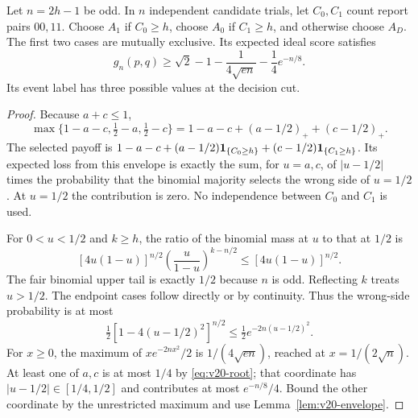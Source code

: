 \begin{lemma}
\label{lem:v20-majority}
Let $n=2h-1$ be odd. In $n$ independent candidate trials, let $C_0,C_1$
count report pairs $00,11$. Choose $A_1$ if $C_0\ge h$, choose $A_0$
if $C_1\ge h$, and otherwise choose $A_D$. The first two cases are
mutually exclusive. Its expected ideal score satisfies
\begin{equation}\label{eq:v20-majorityscore}
 g_n(p,q)\ge\sqrt2-1-\frac1{4\sqrt{en}}
                            -\frac14e^{-n/8}.
\end{equation}
Its event label has three possible values at the decision cut.
\end{lemma}
\begin{proof}
Because $a+c\le1$,
\[
 \max\{1-a-c,\tfrac12-a,\tfrac12-c\}
 =1-a-c+(a-1/2)_++(c-1/2)_+.
\]
The selected payoff is
$1-a-c+(a-1/2)\mathbf 1_{\{C_0\ge h\}}
             +(c-1/2)\mathbf 1_{\{C_1\ge h\}}$.
Its expected loss from this envelope is exactly the sum, for $u=a,c$,
of $|u-1/2|$ times the probability that the binomial majority selects
the wrong side of $u=1/2$. At $u=1/2$ the contribution is zero.
No independence between $C_0$ and $C_1$ is used.

For $0<u<1/2$ and $k\ge h$, the ratio of the binomial mass at $u$ to
that at $1/2$ is
\[
 [4u(1-u)]^{n/2}\left(\frac{u}{1-u}\right)^{k-n/2}
                  \le[4u(1-u)]^{n/2}.
\]
The fair binomial upper tail is exactly $1/2$ because $n$ is odd.
Reflecting $k$ treats $u>1/2$. The endpoint cases follow directly or by
continuity. Thus the wrong-side probability is at most
\[
 \tfrac12[1-4(u-1/2)^2]^{n/2}
             \le\tfrac12 e^{-2n(u-1/2)^2}.
\]
For $x\ge0$, the maximum of $xe^{-2nx^2}/2$ is
$1/(4\sqrt{en})$, reached at $x=1/(2\sqrt n)$.
At least one of $a,c$ is at most $1/4$ by \eqref{eq:v20-root}; that
coordinate has $|u-1/2|\in[1/4,1/2]$ and contributes at most
$e^{-n/8}/4$. Bound the other coordinate by the unrestricted maximum
and use Lemma~\ref{lem:v20-envelope}.
\end{proof}

